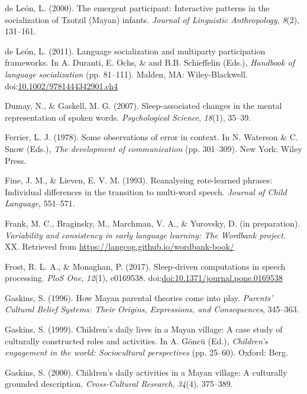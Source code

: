 \documentclass[floatsintext,man]{apa6}
\theoremstyle{definition}
\theoremstyle{definition}
\theoremstyle{definition}
\theoremstyle{remark}
\begin{document}
\hypertarget{ref-deleon2000emergent}{}
de León, L. (2000). The emergent participant: Interactive patterns in
the socialization of Tzotzil (Mayan) infants. \emph{Journal of
Linguistic Anthropology}, \emph{8}(2), 131--161.

\hypertarget{ref-deleon2011language}{}
de León, L. (2011). Language socialization and multiparty participation
frameworks. In A. Duranti, E. Ochs, \& and B.B. Schieffelin (Eds.),
\emph{Handbook of language socialization} (pp. 81--111). Malden, MA:
Wiley-Blackwell.
doi:\href{https://doi.org/10.1002/9781444342901.ch4}{10.1002/9781444342901.ch4}

\hypertarget{ref-dumay2007sleep}{}
Dumay, N., \& Gaskell, M. G. (2007). Sleep-associated changes in the
mental representation of spoken words. \emph{Psychological Science},
\emph{18}(1), 35--39.

\hypertarget{ref-ferrier1978some}{}
Ferrier, L. J. (1978). Some observations of error in context. In N.
Waterson \& C. Snow (Eds.), \emph{The development of communication} (pp.
301--309). New York: Wiley Press.

\hypertarget{ref-pine1993reanalysing}{}
Fine, J. M., \& Lieven, E. V. M. (1993). Reanalysing rote-learned
phrases: Individual differences in the transition to multi-word speech.
\emph{Journal of Child Language}, 551--571.

\hypertarget{ref-frankIPvariability}{}
Frank, M. C., Braginsky, M., Marchman, V. A., \& Yurovsky, D. (in
preparation). \emph{Variability and consistency in early language
learning: The Wordbank project}. XX. Retrieved from
\url{https://langcog.github.io/wordbank-book/}

\hypertarget{ref-frost2017sleep}{}
Frost, R. L. A., \& Monaghan, P. (2017). Sleep-driven computations in
speech processing. \emph{PloS One}, \emph{12}(1), e0169538.
doi:\href{https://doi.org/doi:10.1371/journal.pone.0169538}{doi:10.1371/journal.pone.0169538}

\hypertarget{ref-gaskins1996how}{}
Gaskins, S. (1996). How Mayan parental theories come into play.
\emph{Parents' Cultural Belief Systems: Their Origins, Expressions, and
Consequences}, 345--363.

\hypertarget{ref-gaskins1999childrens}{}
Gaskins, S. (1999). Children's daily lives in a Mayan village: A case
study of culturally constructed roles and activities. In A. Göncü (Ed.),
\emph{Children's engagement in the world: Sociocultural perspectives}
(pp. 25--60). Oxford: Berg.

\hypertarget{ref-gaskins2000childrens}{}
Gaskins, S. (2000). Children's daily activities in a Mayan village: A
culturally grounded description. \emph{Cross-Cultural Research},
\emph{34}(4), 375--389.
\end{document}
